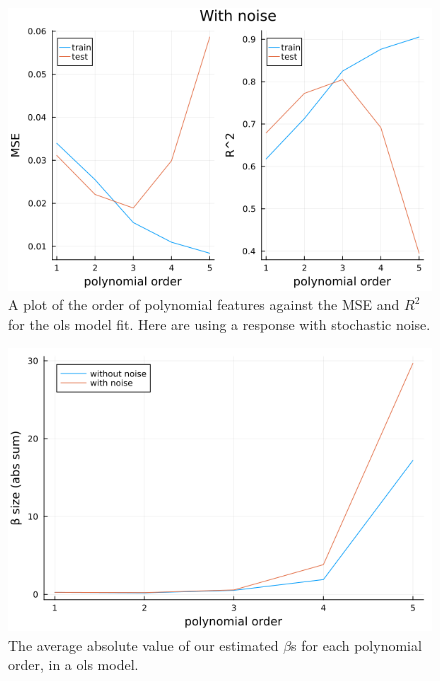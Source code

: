 \documentclass{article}
\begin{document}
\begin{figure}
    \centerline{\includegraphics[scale=0.5]{linearregression_with_noise}}
    \caption{A plot of the order of polynomial features against the MSE and $R^2$ for the ols model fit. Here are using a response with stochastic noise.}
    \label{linearregression-with-noise}
\end{figure}

\begin{figure}
    \centerline{\includegraphics[scale=0.5]{linearregression_beta_size}}
    \caption{The average absolute value of our estimated $\beta$s for each polynomial order, in a ols model.}
    \label{beta-abs-sum}
\end{figure}
\end{document}
